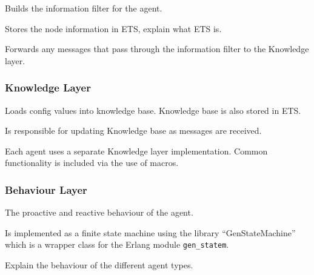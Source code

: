 Builds the information filter for the agent.

Stores the node information in ETS, explain what ETS is.

Forwards any messages that pass through the information filter to the Knowledge layer.

\subsubsection{Knowledge Layer}

Loads config values into knowledge base.
Knowledge base is also stored in ETS\@.

Is responsible for updating Knowledge base as messages are received.

Each agent uses a separate Knowledge layer implementation.
Common functionality is included via the use of macros.

\subsubsection{Behaviour Layer}

The proactive and reactive behaviour of the agent.

Is implemented as a finite state machine using the library ``GenStateMachine'' which is a wrapper class for the Erlang module \verb|gen_statem|.

Explain the behaviour of the different agent types.
